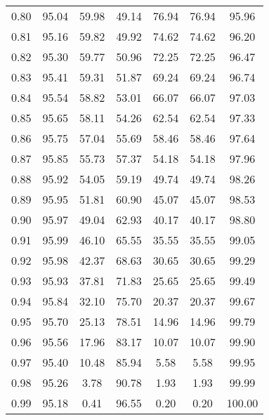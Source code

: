 \begin{tabular}{|c|c|c|c|c|c|c|}
      0.80 &     95.04 &     59.98 &      49.14 &   76.94 &      76.94 &         95.96 \\
      0.81 &     95.16 &     59.82 &      49.92 &   74.62 &      74.62 &         96.20 \\
      0.82 &     95.30 &     59.77 &      50.96 &   72.25 &      72.25 &         96.47 \\
      0.83 &     95.41 &     59.31 &      51.87 &   69.24 &      69.24 &         96.74 \\
      0.84 &     95.54 &     58.82 &      53.01 &   66.07 &      66.07 &         97.03 \\
      0.85 &     95.65 &     58.11 &      54.26 &   62.54 &      62.54 &         97.33 \\
      0.86 &     95.75 &     57.04 &      55.69 &   58.46 &      58.46 &         97.64 \\
      0.87 &     95.85 &     55.73 &      57.37 &   54.18 &      54.18 &         97.96 \\
      0.88 &     95.92 &     54.05 &      59.19 &   49.74 &      49.74 &         98.26 \\
      0.89 &     95.95 &     51.81 &      60.90 &   45.07 &      45.07 &         98.53 \\
      0.90 &     95.97 &     49.04 &      62.93 &   40.17 &      40.17 &         98.80 \\
      0.91 &     95.99 &     46.10 &      65.55 &   35.55 &      35.55 &         99.05 \\
      0.92 &     95.98 &     42.37 &      68.63 &   30.65 &      30.65 &         99.29 \\
      0.93 &     95.93 &     37.81 &      71.83 &   25.65 &      25.65 &         99.49 \\
      0.94 &     95.84 &     32.10 &      75.70 &   20.37 &      20.37 &         99.67 \\
      0.95 &     95.70 &     25.13 &      78.51 &   14.96 &      14.96 &         99.79 \\
      0.96 &     95.56 &     17.96 &      83.17 &   10.07 &      10.07 &         99.90 \\
      0.97 &     95.40 &     10.48 &      85.94 &    5.58 &       5.58 &         99.95 \\
      0.98 &     95.26 &      3.78 &      90.78 &    1.93 &       1.93 &         99.99 \\
      0.99 &     95.18 &      0.41 &      96.55 &    0.20 &       0.20 &        100.00 \\
\bottomrule
\end{tabular}
